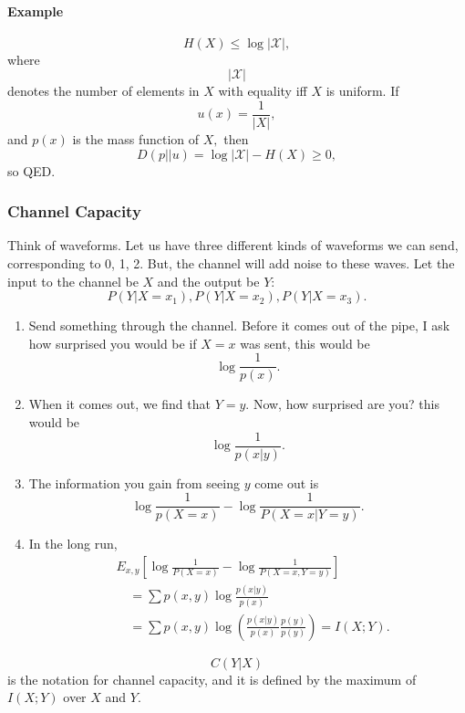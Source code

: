 \documentclass[12pt]{article}
\begin{document}
\paragraph{Example}
\[H(X)\le\log|\mathscr{X}|,\]
where \[|\mathscr{X}|\] denotes the number of elements in $X$ with equality iff $X$ is uniform.
If 
\[u(x)=\frac{1}{|X|},\] and $p(x)$ is the mass function of $X,$ then
\[D(p||u)=\log|\mathscr{X}|-H(X)\ge 0,\] so QED.

\subsubsection{Channel Capacity}

Think of waveforms. Let us have three different kinds of waveforms we can send, corresponding to 0, 1, 2. But, the channel will add noise to these waves. Let the input to the channel be $X$ and the output be $Y$:
\[P(Y|X=x_1),P(Y|X=x_2),P(Y|X=x_3).\]
\begin{enumerate}
    \item Send something through the channel. Before it comes out of the pipe, I ask how surprised you would be if $X=x$ was sent, this would be
    \[\log\frac{1}{p(x)}.\]
    \item When it comes out, we find that $Y=y.$ Now, how surprised are you? this would be
    \[\log\frac{1}{p(x|y)}.\]
    \item The information you gain from seeing $y$ come out is 
    \[\log\frac{1}{p(X=x)}-\log\frac{1}{P(X=x|Y=y)}.\]
    \item In the long run,
    \begin{align*}&E_{x,y}\left[\log\frac{1}{P(X=x)}-\log\frac{1}{P(X=x,Y=y)}\right]\\&\quad =\sum p(x,y)\log\frac{p(x|y)}{p(x)}\\&\quad =\sum p(x,y)\log\left(\frac{p(x|y)}{p(x)}\frac{p(y)}{p(y)}\right)=I(X;Y).\end{align*}
\end{enumerate}
\[C(Y|X)\] is the notation for channel capacity, and it is defined by the maximum of $I(X;Y)$ over  $X$ and $Y.$
\end{document}
